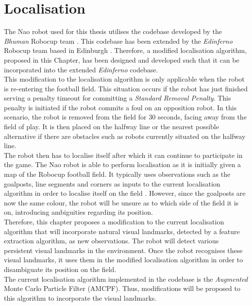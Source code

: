 \documentclass[11pt]{report}
\begin{document}
\chapter{Localisation}
\label{sec:localisation}
The Nao robot used for this thesis utilises the codebase developed by the \textit{Bhuman} Robocup team \cite{Bhuman}. This codebase has been extended by the \textit{Edinferno} Robocup team based in Edinburgh \cite{edinferno}. Therefore, a modified localisation algorithm, proposed in this Chapter,  has been designed and developed such that it can be incorporated into the extended \textit{Edinferno} codebase.\\

This modification to the localisation algorithm is only applicable when the robot is re-entering the football field. This situation occurs if the robot has just finished serving a penalty timeout for committing a \textit{Standard Removal Penalty}\cite{Rules}. This penalty is initiated if the robot commits a foul on an opposition robot. In this scenario, the robot is removed from the field for $30$ seconds, facing away from the field of play. It is then placed on the halfway line or the nearest possible alternative if there are obstacles such as robots currently situated on the halfway line.\\

The robot then has to localise itself after which it can continue to participate in the game. The Nao robot is able to perform localisation as it is initially given a map of the Robocup football field. It typically uses observations such as the goalposts, line segments and corners as inputs to the current localisation algorithm in order to localise itself on the field \cite{Bhuman}. However, since the goalposts are now the same colour, the robot will be unsure as to which side of the field it is on, introducing ambiguities regarding its position.\\

Therefore, this chapter proposes a modification to the current localisation algorithm that will incorporate natural visual landmarks, detected by a feature extraction algorithm, as new observations. The robot will detect various persistent visual landmarks in the environment. Once the robot recognises these visual landmarks, it uses them in the modified localisation algorithm in order to disambiguate its position on the field.\\

The current localisation algorithm implemented in the codebase is the \textit{Augmented} Monte Carlo Particle Filter (AMCPF)\cite{Laue}. Thus, modifications will be proposed to this algorithm to incorporate the visual landmarks.\\
\end{document}
